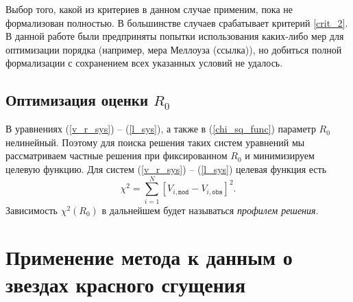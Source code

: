 \documentclass{matmex-diploma-custom}
\begin{document}
Выбор того, какой из критериев в данном случае применим, пока не формализован полностью. В большинстве случаев срабатывает критерий \ref{crit_2}. В данной работе были предприняты попытки использования каких-либо мер для оптимизации порядка (например, мера Меллоуза (ссылка)), но добиться полной формализации с сохранением всех указанных условий не удалось.

\subsection{Оптимизация оценки $R_0$}
В уравнениях (\ref{v_r_sys}) -- (\ref{l_sys}), а также в (\ref{chi_sq_func}) параметр $R_0$ нелинейный. Поэтому для поиска решения таких систем уравнений мы рассматриваем частные решения при фиксированном $R_0$ и минимизируем целевую функцию. Для систем (\ref{v_r_sys}) -- (\ref{l_sys}) целевая функция есть
\begin{equation}
        \chi^2 = \sum_{i=1}^{N} \left [ V_{i, \texttt{mod}} - V_{i, \texttt{obs}} \right ]^2.
\end{equation}
Зависимость $\chi^2(R_0)$ в дальнейшем будет называться \textit{профилем решения}.

\section{Применение метода к данным о звездах красного сгущения}
\end{document}

